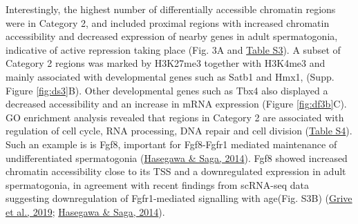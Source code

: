 \documentclass[12pt,twoside]{reedthesis}
\begin{document}
Interestingly, the highest number of differentially accessible chromatin
regions were in Category 2, and included proximal regions with increased
chromatin accessibility and decreased expression of nearby genes in
adult spermatogonia, indicative of active repression taking place (Fig.
3A and \protect\hyperlink{st}{Table S3}). A subset of Category 2 regions was marked by H3K27me3
together with H3K4me3 and mainly associated with developmental genes
such as Satb1 and Hmx1, (Supp. Figure \ref{fig:ds3}B). Other developmental genes such as
Tbx4 also displayed a decreased accessibility and an increase in mRNA
expression (Figure \ref{fig:df3b}C). GO enrichment analysis revealed that regions in
Category 2 are associated with regulation of cell cycle, RNA processing,
DNA repair and cell division (\protect\hyperlink{st}{Table S4}). Such an example is is Fgf8,
important for Fgf8-Fgfr1 mediated maintenance of undifferentiated
spermatogonia (\protect\hyperlink{ref-hasegawa2014}{Hasegawa \& Saga, 2014}). Fgf8 showed increased chromatin
accessibility close to its TSS and a downregulated expression in adult
spermatogonia, in agreement with recent findings from scRNA-seq data
suggesting downregulation of Fgfr1-mediated signalling with age(Fig.
S3B) (\protect\hyperlink{ref-grive2019}{Grive et al., 2019}; \protect\hyperlink{ref-hasegawa2014}{Hasegawa \& Saga, 2014}).
\end{document}
